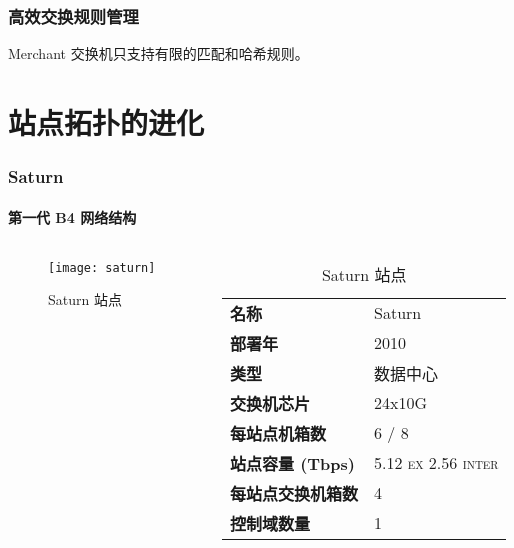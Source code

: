     \begin{frame}
        \frametitle{高效交换规则管理}
        Merchant 交换机只支持有限的匹配和哈希规则。

    \end{frame}

    \section{站点拓扑的进化}


    \begin{frame}
        \frametitle{Saturn}
        \framesubtitle{第一代 B4 网络结构}
        \begin{columns}
            \begin{column}{0.4\textwidth}
                \begin{figure}
                    \texttt{[image: saturn]}
                    \caption{Saturn 站点}
                \end{figure}
            \end{column}
            \begin{column}{0.6\textwidth}
                \begin{table}
                    \begin{tabular}{>{\bfseries}ll}
                        \toprule
                        名称 & Saturn \\
                        部署年 & 2010 \\
                        类型 & 数据中心 \\
                        交换机芯片 & 24x10G \\
                        每站点机箱数 & 6 / 8 \\
                        站点容量 (Tbps) & 5.12 \textsc{ex} 2.56 \textsc{inter}\\
                        每站点交换机箱数 & 4 \\
                        控制域数量 & 1 \\
                        \bottomrule
                    \end{tabular}
                    \caption{Saturn 站点}\label{tab:saturn}
                \end{table}
            \end{column}
        \end{columns}
    \end{frame}


